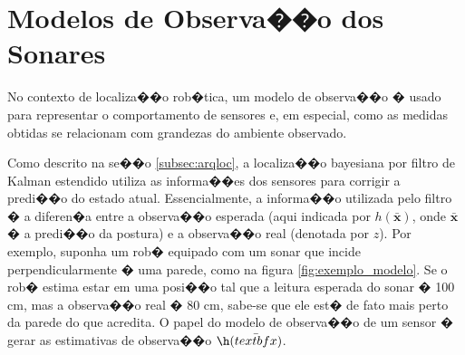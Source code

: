 \newcommand{\hx}{$h(\bar{\bf{x}})$}

\chapter{Modelos de Observa��o dos Sonares}\label{subsec:modelosonares}
No contexto de localiza��o rob�tica, um modelo de observa��o � usado para representar o comportamento de sensores e, em especial, como as medidas obtidas se relacionam com grandezas do ambiente observado. 

Como descrito na se��o \ref{subsec:arqloc}, a localiza��o bayesiana por filtro de Kalman estendido utiliza as informa��es dos sensores para corrigir a predi��o do estado atual. Essencialmente, a informa��o utilizada pelo filtro � a diferen�a entre a observa��o esperada (aqui indicada por $h(\bar{\textbf{x}})$, onde $\bar{\textbf{x}}$ � a predi��o da postura) e a observa��o real (denotada por $z$). Por exemplo, suponha um rob� equipado com um sonar que incide perpendicularmente � uma parede, como na figura \ref{fig:exemplo_modelo}. Se o rob� estima estar em uma posi��o tal que a leitura esperada do sonar � 100 cm, mas a observa��o real � 80 cm, sabe-se que ele est� de fato mais perto da parede do que acredita. O papel do modelo de observa��o de um sensor � gerar as estimativas de observa��o $\h(\bar{textbf{x}})$.

